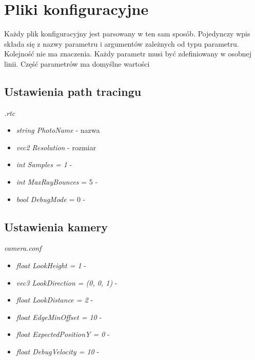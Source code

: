 \documentclass[inz,longabstract]{iithesis}
\begin{document}
    \section{Pliki konfiguracyjne}
        Każdy plik konfiguracyjny jest parsowany w ten sam sposób. Pojedynczy wpis składa się z nazwy parametru i argumentów zależnych od typu parametru. Kolejność nie ma znaczenia. Każdy parametr musi być zdefiniowany w osobnej linii. Część parametrów ma domyślne wartości 
        
        \subsection{Ustawienia path tracingu}
        \textit{.rtc}
        \begin{itemize}
            \item \textit{string PhotoName} - nazwa 
            \item \textit{vec2 Resolution} - rozmiar 
            \item \textit{int Samples = 1} - 
            \item \textit{int MaxRayBounces} = 5 -  
            \item \textit{bool DebugMode} = 0 - 
        \end{itemize}

        \subsection{Ustawienia kamery}
        \textit{camera.conf}
        \begin{itemize}
            \item \textit{float LookHeight = 1} - 
            \item \textit{vec3 LookDirection = (0, 0, 1)} - 
            \item \textit{float LookDistance = 2} - 
            \item \textit{float EdgeMinOffset = 10} - 
            \item \textit{float ExpectedPositionY = 0} -
            \item \textit{float DebugVelocity = 10} -
        \end{itemize}
        
\end{document}
